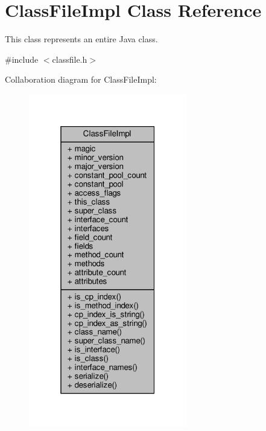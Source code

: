 \hypertarget{classClassFileImpl}{}\section{Class\+File\+Impl Class Reference}
\label{classClassFileImpl}


This class represents an entire Java class.  




{\ttfamily \#include $<$classfile.\+h$>$}



Collaboration diagram for Class\+File\+Impl\+:
\nopagebreak
\begin{figure}[H]
\begin{center}
\leavevmode
\includegraphics[width=196pt]{classClassFileImpl__coll__graph}
\end{center}
\end{figure}
